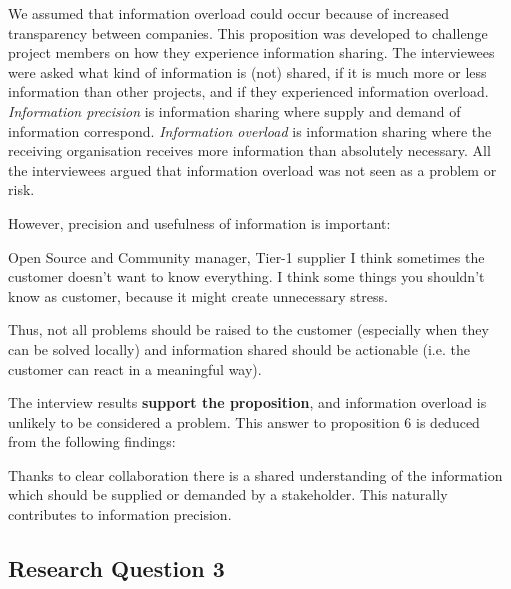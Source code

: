 
We assumed that information overload could occur because of increased transparency between companies. This proposition was developed to challenge project members on how they experience information sharing. The interviewees were asked what kind of information is (not) shared, if it is much more or less information than other projects, and if they experienced information overload. {\em Information precision} is information sharing where supply and demand of information correspond. {\em Information overload} is information sharing where the receiving organisation receives more information than absolutely necessary. All the interviewees argued that information overload was not seen as a problem or risk.

However, precision and usefulness of information is important:

\begin{aquote}{Open Source and Community manager, Tier-1 supplier}
I think sometimes the customer doesn't want to know everything. I think some things you shouldn't know as customer, because it might create unnecessary stress.
\end{aquote}

Thus, not all problems should be raised to the customer (especially when they can be solved locally) and information shared should be actionable (i.e. the customer can react in a meaningful way).
%

The interview results {\bf support the proposition}, and information overload is unlikely to be considered a problem. This answer to proposition 6 is deduced from the following findings:

 Thanks to clear collaboration there is a shared understanding of the information which should be supplied or demanded by a stakeholder. This naturally contributes to information precision.

\subsection{Research Question 3}\label{sec:ResearchQuestion3}

